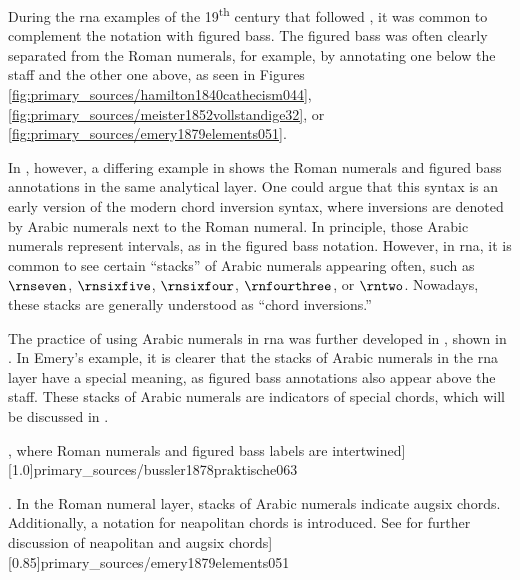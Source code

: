 
During the \gls{rna} examples of the 19\textsuperscript{th}
century that followed \textcite{weber1818versuch}, it was
common to complement the notation with figured bass. The
figured bass was often clearly separated from the Roman
numerals, for example, by annotating one below the staff and
the other one above, as seen in Figures
\ref{fig:primary_sources/hamilton1840cathecism044},
\ref{fig:primary_sources/meister1852vollstandige32}, or
\ref{fig:primary_sources/emery1879elements051}.

In ,
however, a differing example in
\textcite{bussler1878praktische} shows the Roman numerals
and figured bass annotations in the same analytical layer.
One could argue that this syntax is an early version of the
modern chord inversion syntax, where inversions are denoted
by Arabic numerals next to the Roman numeral. In principle,
those Arabic numerals represent intervals, as in the figured
bass notation. However, in \gls{rna}, it is common to see
certain ``stacks'' of Arabic numerals appearing often, such
as $\rnseven$, $\rnsixfive$, $\rnsixfour$, $\rnfourthree$,
or $\rntwo$. Nowadays, these stacks are generally understood
as ``chord inversions.'' 

The practice of using Arabic numerals in \gls{rna} was
further developed in \textcite{emery1879elements}, shown in
. In Emery's
example, it is clearer that the stacks of Arabic numerals in
the \gls{rna} layer have a special meaning, as figured bass
annotations also appear above the staff. These stacks of
Arabic numerals are indicators of special chords, which will
be discussed in
.

\phdfigure[A single layer of chord annotations underneath
 the bass staff in \textcite[p.~63]{bussler1878praktische},
 where Roman numerals and figured bass labels are
 intertwined][1.0]{primary_sources/bussler1878praktische063}

\phdfigure[Use of Roman numerals and figured bass in
\textcite[p.~51]{emery1879elements}. In the Roman numeral
layer, stacks of Arabic numerals indicate \gls{augsix}
chords. Additionally, a notation for \gls{neapolitan} chords
is introduced. See
for further discussion of \gls{neapolitan} and \gls{augsix}
chords][0.85]{primary_sources/emery1879elements051}

